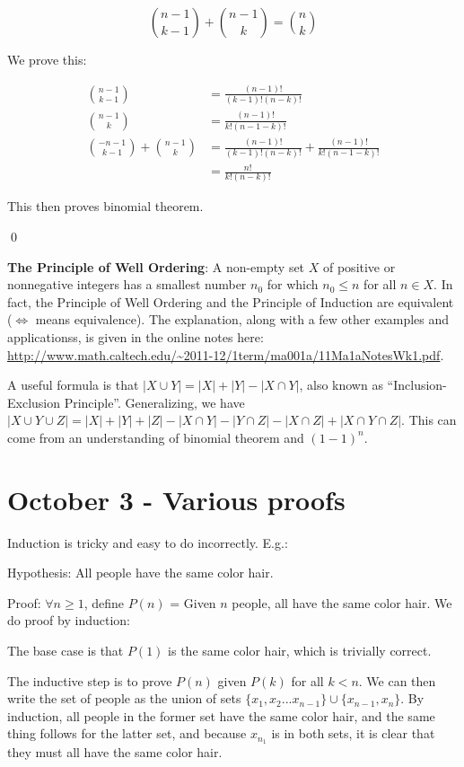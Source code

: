 \documentclass{report}
\begin{document}
$${n-1 \choose k-1} + {n-1 \choose k} = {n \choose k}$$

We prove this:

\begin{align*}
{n-1 \choose k-1} &= \frac{(n-1)!}{(k-1)!(n-k)!}\\
{n-1 \choose k} &= \frac{(n-1)!}{k!(n-1-k)!}\\
{-n-1 \choose k-1} + {n-1 \choose k} &= \frac{(n-1)!}{(k-1)!(n-k)!} + \frac{(n-1)!}{k!(n-1-k)!}\\
&= \frac{n!}{k!(n-k)!}
\end{align*}

This then proves binomial theorem. 

\qed

\textbf{The Principle of Well Ordering}: A non-empty set $X$ of positive or nonnegative integers has a smallest number $n_0$ for which $n_0 \leq n$ for all $n \in X$. In fact, the Principle of Well Ordering and the Principle of Induction are equivalent ($\Leftrightarrow$ means equivalence). The explanation, along with a few other examples and applicationss, is given in the online notes here: \url{http://www.math.caltech.edu/~2011-12/1term/ma001a/11Ma1aNotesWk1.pdf}.

A useful formula is that $|X \cup Y| = |X| + |Y| - |X \cap Y|$, also known as "`Inclusion-Exclusion Principle"'. Generalizing, we have $|X \cup Y \cup Z| = |X| + |Y| + |Z| - |X \cap Y| - |Y \cap Z| - |X \cap Z| + |X \cap Y \cap Z|$. This can come from an understanding of binomial theorem and $(1-1)^n$.

\chapter{October 3 - Various proofs}

Induction is tricky and easy to do incorrectly. E.g.:

Hypothesis: All people have the same color hair.

Proof: $\forall n \geq 1$, define $P(n)$ = Given $n$ people, all have the same color hair. We do proof by induction:

The base case is that $P(1)$ is the same color hair, which is trivially correct.

The inductive step is to prove $P(n)$ given $P(k)$ for all $k<n$. We can then write the set of people as the union of sets $\{x_1, x_2...x_{n-1}\} \cup \{x_{n-1},x_n\}$. By induction, all people in the former set have the same color hair, and the same thing follows for the latter set, and because $x_{n_1}$ is in both sets, it is clear that they must all have the same color hair.
\end{document}
